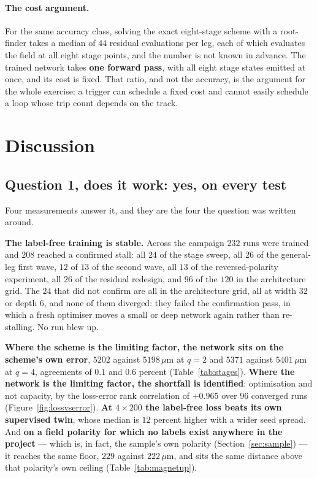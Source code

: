 \documentclass[11pt,a4paper]{article}
\newcommand{\um}{\ensuremath{\,\mu\mathrm{m}}}
\begin{document}
\paragraph{The cost argument.}
For the same accuracy class, solving the exact eight-stage scheme with a
root-finder takes a median of $44$ residual evaluations per leg, each of which
evaluates the field at all eight stage points, and the number is not known in
advance. The trained network takes \textbf{one forward pass}, with all eight
stage states emitted at once, and its cost is fixed. That ratio, and not the
accuracy, is the argument for the whole exercise: a trigger can schedule a fixed
cost and cannot easily schedule a loop whose trip count depends on the track.

\section{Discussion}
\label{sec:discussion}

\subsection{Question 1, does it work: yes, on every test}

Four measurements answer it, and they are the four the question was written
around.

\textbf{The label-free training is stable.} Across the campaign $232$ runs were
trained and $208$ reached a confirmed stall: all $24$ of the stage sweep, all
$26$ of the general-leg first wave, $12$ of $13$ of the second wave, all $13$ of
the reversed-polarity experiment, all $26$ of the residual redesign, and $96$ of
the $120$ in the architecture grid. The $24$ that did not confirm are all in the
architecture grid, all at width $32$ or depth $6$, and none of them diverged:
they failed the confirmation pass, in which a fresh optimiser moves a small or
deep network again rather than re-stalling. No run blew up.

\textbf{Where the scheme is the limiting factor, the network sits on the
scheme's own error}, $5202$ against $5198\um$ at $q = 2$ and $5371$ against
$5401\um$ at $q = 4$, agreements of $0.1$ and $0.6$ percent
(Table~\ref{tab:stages}). \textbf{Where the network is the limiting factor, the
shortfall is identified}: optimisation and not capacity, by the loss-error rank
correlation of $+0.965$ over $96$ converged runs
(Figure~\ref{fig:lossvserror}). \textbf{At $4 \times 200$ the label-free loss
beats its own supervised twin}, whose median is $12$ percent higher with a wider
seed spread. And \textbf{on a field polarity for which no labels exist anywhere
in the project} --- which is, in fact, the sample's own polarity
(Section~\ref{sec:sample}) --- it reaches the same floor, $229$ against
$222\um$, and sits the same distance above that polarity's own ceiling
(Table~\ref{tab:magnetup}).
\end{document}
